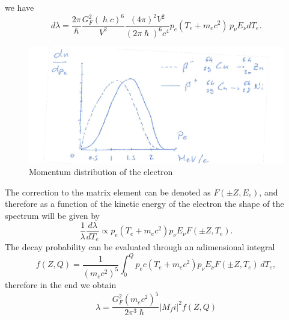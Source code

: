 we have
\begin{equation*}
    d\lambda = \frac{2\pi}{\hslash} \frac{G_F^2(\hslash c)^6}{V^2}\frac{(4\pi)^2V^2}{(2\pi\hslash)^6c^4} p_e (T_e + m_e c^2) \,
    p_\nu E_\nu dT_e.
\end{equation*}
\begin{figure}[h]
    \centering
    \includegraphics[scale=0.5]{Figures/nuclear-physics-fig20}
    \caption{Momentum distribution of the electron}
    \label{nuclear-physics-fig:20}
\end{figure}
The correction to the matrix element can be denoted as $F(\pm Z, E_e)$, and therefore as a function of the kinetic energy of the electron the shape of the spectrum will be given by
\begin{equation*}
    \frac{1}{\lambda} \frac{d\lambda}{dT_e} \propto p_e (T_e+m_ec^2) p_\nu E_\nu F(\pm Z, T_e).
\end{equation*}
The decay probability can be evaluated through an adimensional integral 
\begin{equation*}
    f(Z,Q) = \frac{1}{(m_ec^2)^5}\int_0^Q p_e c (T_e + m_e c^2) p_\nu E_\nu F(\pm Z, T_e) \, dT_e,
\end{equation*}
therefore in the end we obtain
\begin{equation*}
    \lambda = \frac{G_F^2(m_ec^2)^5}{2\pi^3\hslash}|M_fi|^2 f(Z,Q)
\end{equation*}

